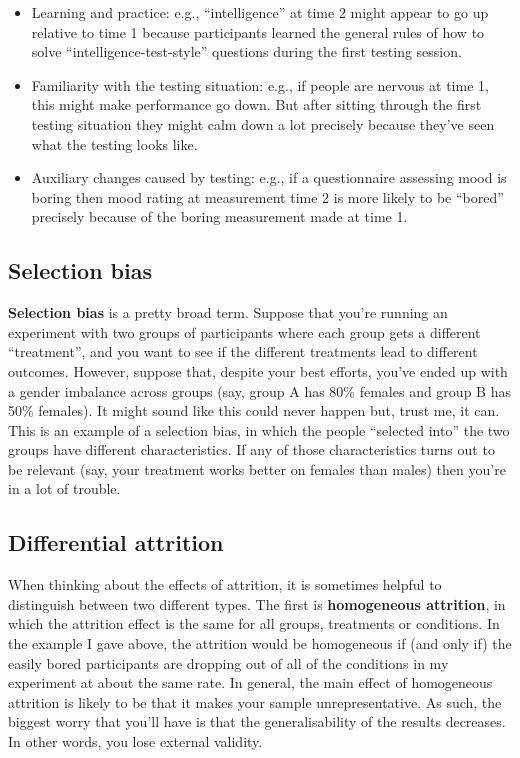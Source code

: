 \documentclass[
  a4paper,
]{book}
\providecommand{\tightlist}{%
  \setlength{\itemsep}{0pt}\setlength{\parskip}{0pt}}
\begin{document}
\begin{itemize}
\tightlist
\item
  Learning and practice: e.g., ``intelligence'' at time 2 might appear
  to go up relative to time 1 because participants learned the general
  rules of how to solve ``intelligence-test-style'' questions during the
  first testing session.
\item
  Familiarity with the testing situation: e.g., if people are nervous at
  time 1, this might make performance go down. But after sitting through
  the first testing situation they might calm down a lot precisely
  because they've seen what the testing looks like.
\item
  Auxiliary changes caused by testing: e.g., if a questionnaire
  assessing mood is boring then mood rating at measurement time 2 is
  more likely to be ``bored'' precisely because of the boring
  measurement made at time 1.
\end{itemize}

\subsection{Selection bias}\label{selection-bias}

\textbf{Selection bias} is a pretty broad term. Suppose that you're
running an experiment with two groups of participants where each group
gets a different ``treatment'', and you want to see if the different
treatments lead to different outcomes. However, suppose that, despite
your best efforts, you've ended up with a gender imbalance across groups
(say, group A has 80\% females and group B has 50\% females). It might
sound like this could never happen but, trust me, it can. This is an
example of a selection bias, in which the people ``selected into'' the
two groups have different characteristics. If any of those
characteristics turns out to be relevant (say, your treatment works
better on females than males) then you're in a lot of trouble.

\subsection{Differential attrition}\label{differential-attrition}

When thinking about the effects of attrition, it is sometimes helpful to
distinguish between two different types. The first is
\textbf{homogeneous attrition}, in which the attrition effect is the
same for all groups, treatments or conditions. In the example I gave
above, the attrition would be homogeneous if (and only if) the easily
bored participants are dropping out of all of the conditions in my
experiment at about the same rate. In general, the main effect of
homogeneous attrition is likely to be that it makes your sample
unrepresentative. As such, the biggest worry that you'll have is that
the generalisability of the results decreases. In other words, you lose
external validity.
\end{document}
